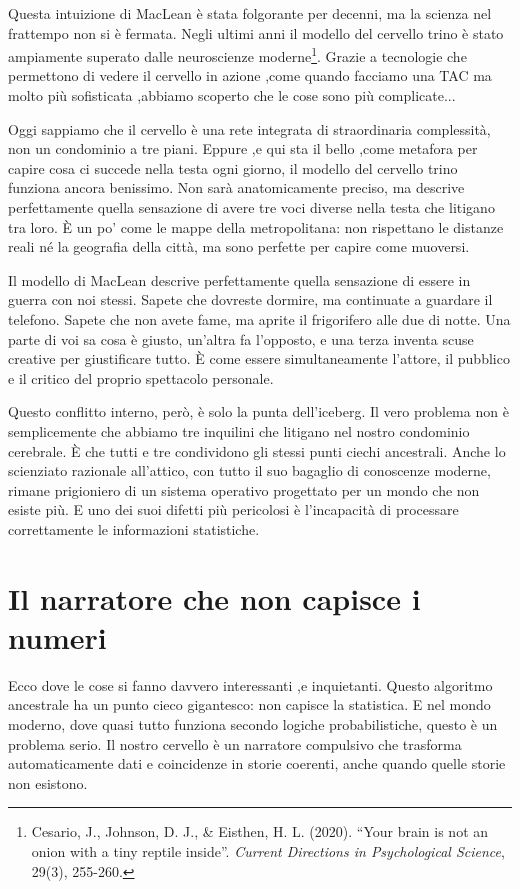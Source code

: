 Questa intuizione di MacLean è stata folgorante per decenni, ma la scienza nel frattempo non si è fermata. Negli ultimi anni il modello del cervello trino è stato ampiamente superato dalle neuroscienze moderne\footnote{Cesario, J., Johnson, D. J., \& Eisthen, H. L. (2020). ``Your brain is not an onion with a tiny reptile inside''. \textit{Current Directions in Psychological Science}, 29(3), 255-260.}. Grazie a tecnologie che permettono di vedere il cervello in azione ,come quando facciamo una TAC ma molto più sofisticata ,abbiamo scoperto che le cose sono più complicate...

Oggi sappiamo che il cervello è una rete integrata di straordinaria complessità, non un condominio a tre piani. Eppure ,e qui sta il bello ,come metafora per capire cosa ci succede nella testa ogni giorno, il modello del cervello trino funziona ancora benissimo. Non sarà anatomicamente preciso, ma descrive perfettamente quella sensazione di avere tre voci diverse nella testa che litigano tra loro. È un po' come le mappe della metropolitana: non rispettano le distanze reali né la geografia della città, ma sono perfette per capire come muoversi.

Il modello di MacLean descrive perfettamente quella sensazione di essere in guerra con noi stessi. Sapete che dovreste dormire, ma continuate a guardare il telefono. Sapete che non avete fame, ma aprite il frigorifero alle due di notte. Una parte di voi sa cosa è giusto, un'altra fa l'opposto, e una terza inventa scuse creative per giustificare tutto. È come essere simultaneamente l'attore, il pubblico e il critico del proprio spettacolo personale.

Questo conflitto interno, però, è solo la punta dell'iceberg. Il vero problema non è semplicemente che abbiamo tre inquilini che litigano nel nostro condominio cerebrale. È che tutti e tre condividono gli stessi punti ciechi ancestrali. Anche lo scienziato razionale all'attico, con tutto il suo bagaglio di conoscenze moderne, rimane prigioniero di un sistema operativo progettato per un mondo che non esiste più. E uno dei suoi difetti più pericolosi è l'incapacità di processare correttamente le informazioni statistiche.

\section{Il narratore che non capisce i numeri}
Ecco dove le cose si fanno davvero interessanti ,e inquietanti. Questo algoritmo ancestrale ha un punto cieco gigantesco: non capisce la statistica. E nel mondo moderno, dove quasi tutto funziona secondo logiche probabilistiche, questo è un problema serio. Il nostro cervello è un narratore compulsivo che trasforma automaticamente dati e coincidenze in storie coerenti, anche quando quelle storie non esistono.

